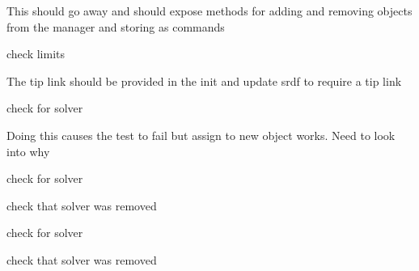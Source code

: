 \begin{DoxyRefList}
%
This should go away and should expose methods for adding and removing objects from the manager and storing as commands  
\item[Member \mbox{\hyperlink{classtesseract__environment_1_1ReplaceJointCommand_a9fdde52130fe2aa8cfeb09138b1ebac6}{tesseract\+\_\+environment\+::Replace\+Joint\+Command\+::Replace\+Joint\+Command}} (const \mbox{\hyperlink{classtesseract__scene__graph_1_1Joint}{tesseract\+\_\+scene\+\_\+graph\+::\+Joint}} \&joint)]\label{todo__todo000003}%
%
check limits  
\item[Class \mbox{\hyperlink{classtesseract__kinematics_1_1KDLFwdKinTree}{tesseract\+\_\+kinematics\+::KDLFwd\+Kin\+Tree}} ]\label{todo__todo000025}%
%
The tip link should be provided in the init and update srdf to require a tip link  
\item[Member \mbox{\hyperlink{tesseract__environment__manipulator__manager__unit_8cpp_ae8cf17c756efd476435f680aab4a9eda}{TEST}} (Tesseract\+Environment\+Manipulator\+Manager\+Unit, Add\+Remove\+ROPKinematics\+Solver\+Unit)]\label{todo__todo000017}%
%
check for solver  
\item[Member \mbox{\hyperlink{tesseract__scene__graph__unit_8cpp_a07e5d7fb0413d0780df4b637bcd35845}{TEST}} (Tesseract\+Scene\+Graph\+Unit, Tesseract\+Scene\+Graph\+Remove\+Link\+Unit)]\label{todo__todo000026}%
%
Doing this causes the test to fail but assign to new object works. Need to look into why  
\item[Member \mbox{\hyperlink{tesseract__environment__manipulator__manager__unit_8cpp_a5a040994e267e8686050c9657c5b04fb}{TEST}} (Tesseract\+Environment\+Manipulator\+Manager\+Unit, Robot\+On\+Positioner\+Unit)]\label{todo__todo000005}%
%
check for solver  
\item[Member \mbox{\hyperlink{tesseract__environment__manipulator__manager__unit_8cpp_a814d8bacce1a47948ea8185be335f12c}{TEST}} (Tesseract\+Environment\+Manipulator\+Manager\+Unit, Add\+Remove\+OPWKinematics\+Solver\+Unit)]\label{todo__todo000022}%
%
check that solver was removed 

\label{todo__todo000021}%
%
check for solver  
\item[Member \mbox{\hyperlink{tesseract__environment__manipulator__manager__unit_8cpp_a252e23e7d97abda1a36102f65e58e836}{TEST}} (Tesseract\+Environment\+Manipulator\+Manager\+Unit, Add\+Remove\+REPKinematics\+Solver\+Unit)]\label{todo__todo000020}%
%
check that solver was removed 


\end{DoxyRefList}
